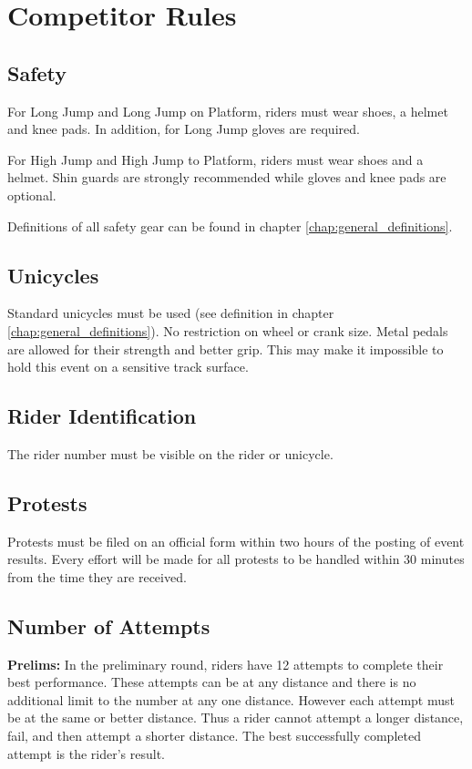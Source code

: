 \chapter{Competitor Rules}

\section{Safety}

For Long Jump and Long Jump on Platform, riders must wear shoes, a helmet and knee pads.
In addition, for Long Jump gloves are required.

For High Jump and High Jump to Platform, riders must wear shoes and a helmet.
Shin guards are strongly recommended while gloves and knee pads are optional.

Definitions of all safety gear can be found in chapter \ref{chap:general_definitions}.

\section{Unicycles}

Standard unicycles must be used (see definition in chapter \ref{chap:general_definitions}).
No restriction on wheel or crank size.
Metal pedals are allowed for their strength and better grip.
This may make it impossible to hold this event on a sensitive track surface.

\section{Rider Identification}

The rider number must be visible on the rider or unicycle.

\section{Protests}

Protests must be filed on an official form within two hours of the posting of event results.
Every effort will be made for all protests to be handled within 30 minutes from the time they are received.

\section{Number of Attempts}

\textbf{Prelims:}
In the preliminary round, riders have 12 attempts to complete their best performance.
These attempts can be at any distance and there is no additional limit to the number at any one distance.
However each attempt must be at the same or better distance.
Thus a rider cannot attempt a longer distance, fail, and then attempt a shorter distance.
The best successfully completed attempt is the rider's result.

